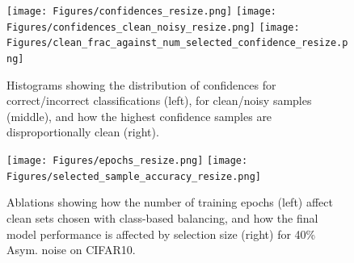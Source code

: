 \documentclass[10pt,twocolumn,letterpaper]{article}
\begin{document}
\begin{figure}[t!]
    \centering
    \texttt{[image: Figures/confidences\_resize.png]}\hfill
    \texttt{[image: Figures/confidences\_clean\_noisy\_resize.png]}\hfill
    \texttt{[image: Figures/clean\_frac\_against\_num\_selected\_confidence\_resize.png]}
    \caption{Histograms showing the distribution of confidences for correct/incorrect classifications (left), for clean/noisy samples (middle), and how the highest confidence samples are disproportionally clean (right).}
    \label{fig:cleanandcorrectbias}
\end{figure}

\begin{figure}[t!]
    \centering
    \texttt{[image: Figures/epochs\_resize.png]} {\hskip 0.3cm}
    \texttt{[image: Figures/selected\_sample\_accuracy\_resize.png]}
    \caption{\small Ablations showing how the number of training epochs (left) affect clean sets chosen with class-based balancing, and how the final model performance is affected by selection size (right) for 40\% Asym. noise on CIFAR10.}
    \label{fig:epochsandaugmentations}
\end{figure}
\end{document}
